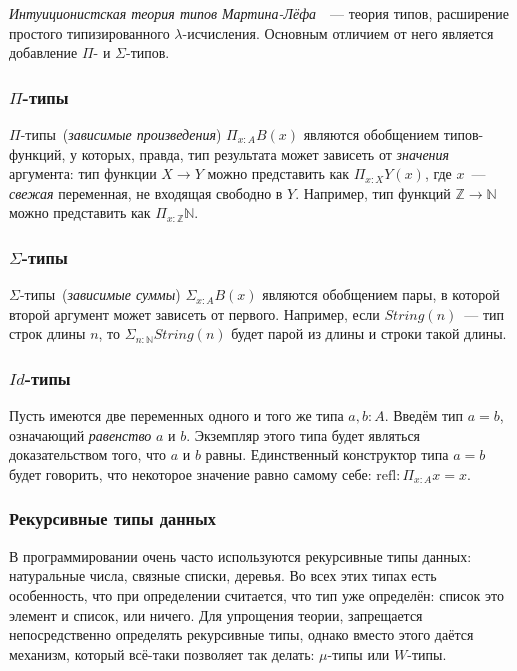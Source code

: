 \emph{Интуиционистская теория типов Мартина-Лёфа}~\cite{mltt}~---
теория типов, расширение простого типизированного
$\lambda$-исчисления. Основным отличием от него является добавление
$\Pi$- и $\Sigma$-типов.

\subsubsection{\texorpdfstring{$\Pi$}{Pi}-типы}

$\Pi$-типы~(\emph{зависимые произведения}) $\Pi_{x:A} B(x)$ являются
обобщением типов-функций, у которых, правда, тип результата может
зависеть от \emph{значения} аргумента: тип функции $X \to Y$ можно
представить как $\Pi_{x:X} Y(x)$, где $x$~--- \emph{свежая}
переменная, не входящая свободно в $Y$. Например, тип функций
$\mathbb{Z} \to \mathbb{N}$ можно представить как $\Pi_{x:\mathbb{Z}}
\mathbb{N}$.

\subsubsection{\texorpdfstring{$\Sigma$}{Sigma}-типы}

$\Sigma$-типы~(\emph{зависимые суммы}) $\Sigma_{x:A} B(x)$ являются
обобщением пары, в которой второй аргумент может зависеть от первого.
Например, если $String(n)$~--- тип строк длины $n$, то
$\Sigma_{n:\mathbb{N}} String(n)$ будет парой из длины и строки такой
длины.

\subsubsection{\texorpdfstring{$Id$}{Id}-типы}

Пусть имеются две переменных одного и того же типа $a, b : A$. Введём
тип $a = b$, означающий \emph{равенство} $a$ и $b$. Экземпляр этого
типа будет являться доказательством того, что $a$ и $b$ равны.
Единственный конструктор типа $a = b$ будет говорить, что некоторое
значение равно самому себе: $\mathrm{refl} : \Pi_{x:A} x = x$.

\subsubsection{Рекурсивные типы данных}

В программировании очень часто используются рекурсивные типы данных:
натуральные числа, связные списки, деревья. Во всех этих типах есть
особенность, что при определении считается, что тип уже определён:
список это элемент и список, или ничего. Для упрощения теории,
запрещается непосредственно определять рекурсивные типы, однако вместо
этого даётся механизм, который всё-таки позволяет так делать:
$\mu$-типы или $W$-типы.

